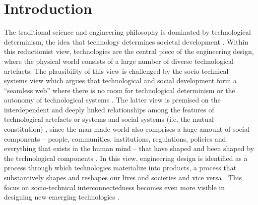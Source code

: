 \section{Introduction}
\label{sec:intro}

The traditional science and engineering philosophy is dominated by technological determinism, the idea that technology determines societal development \cite{Mody2006,Sawyer2014,Smith1994}. Within this reductionist view, technologies are the central piece of the engineering design, where the physical world consists of a large number of diverse technological artefacts. 
The plausibility of this view is challenged by the socio-technical systems view \cite{VanDam2012} which argues that technological and social development form a ``seamless web'' where there is no room for technological determinism or the autonomy of technological systems \cite{Fleischhacker2004}. 
%
The latter view is premised on the interdependent and deeply linked relationships among the features of technological artefacts or systems and social systems (i.e. the mutual constitution) \cite{Sawyer2014}, since the man-made world also comprises a huge amount of social components -- people, communities, institutions, regulations, policies and everything that exists in the human mind -- that have shaped and been shaped by the technological components \cite{Harari2014,VanDam2012}. 
In this view, engineering design is identified as a process through which technologies materialize into products, a process that substantively  shapes  and  reshapes  our  lives  and   societies and vice versa \cite{Kroes2008}. This focus on socio-technical interconnectedness becomes even  more  visible in designing new emerging technologies \cite{Kroes2008}.  

